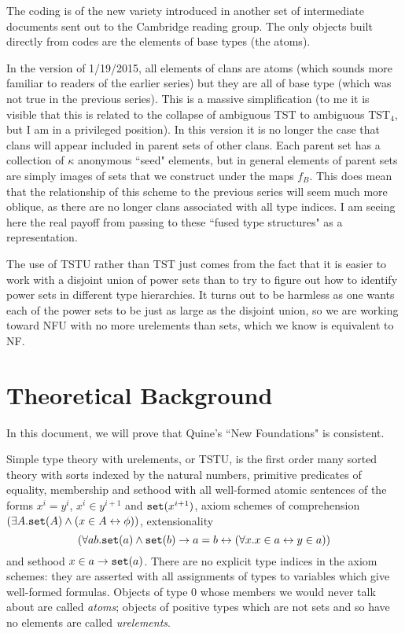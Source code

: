 \documentclass{article}
\begin{document}
The coding is of the new variety introduced in another set of intermediate documents sent out to the Cambridge reading group.  The only objects built directly from codes are
the elements of base types (the atoms).

In the version of 1/19/2015, all elements of clans are atoms (which sounds more familiar to readers of the earlier series) but they are all of base type (which was not true in the previous series).   This is a massive simplification (to me it is visible that this is related to the collapse of ambiguous TST to ambiguous TST$_4$, but I am in a privileged position).   In this version it is no longer the case that clans will appear included in parent sets of other clans.   Each parent set has a collection of $\kappa$ anonymous ``seed" elements, but in general elements of parent sets are simply images of sets that we construct under the maps $f_B$.   This does mean that the relationship of this scheme to the previous series will seem much more oblique, as there are no longer clans associated with all type indices.  I am seeing here the real payoff from passing to these ``fused type structures"  as a representation.

The use of TSTU rather than TST just comes from the fact that it is easier to work with a disjoint union of power sets than to try to figure out how to identify power sets in different type hierarchies.   It turns out to be harmless as one wants each of the power sets to be just as large as the disjoint union, so we are working toward NFU with no more urelements than sets, which we know is equivalent to NF.

\newpage

\section{Theoretical Background}

In this document, we will prove that Quine's ``New Foundations" is consistent.

Simple type theory with urelements,  or TSTU, is the first order many sorted theory with sorts indexed by the natural numbers, primitive predicates of equality, membership and sethood with all well-formed atomic sentences of the forms $x^i=y^i$, $x^i \in y^{i+1}$ and ${\tt set}(x^{i+1})$,  axiom schemes of comprehension $(\exists A.{\tt set}(A) \wedge (x \in A \leftrightarrow \phi))$, extensionality
$$(\forall ab.{\tt set}(a) \wedge {\tt set}(b) \rightarrow a=b \leftrightarrow (\forall x.x \in a \leftrightarrow y \in a))$$ and sethood $x \in a \rightarrow {\tt set}(a)$.   There are no explicit type indices in the axiom schemes:  they are asserted with all assignments of types to variables which give well-formed formulas.  Objects of type 0 whose members we would never talk about are called {\em atoms}; objects of positive types which are not sets and so have no elements are called {\em urelements}.
\end{document}
